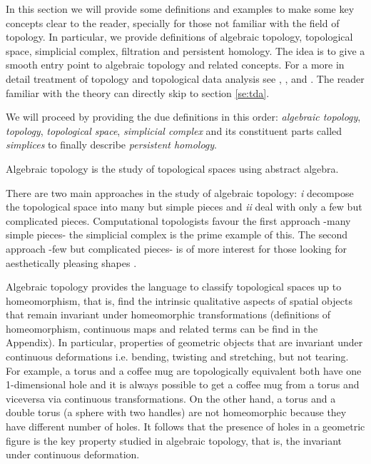 \documentclass[onecollarge,runningheads]{svjour2}
\begin{document}
In this section we will provide some definitions and examples to make some key concepts clear to the reader, specially for those not familiar with the field of topology. In particular, we provide definitions of algebraic topology, topological space, simplicial complex, filtration and persistent homology. The idea is to give a smooth entry point to algebraic topology and related concepts. For a more in detail treatment of topology and topological data analysis see \cite{munkres1984elements}, \cite{hatcher2001}, \cite{carlsson2009topology} and \cite{wasserman2016topological}. The reader familiar with the theory can directly skip to section \ref{se:tda}.

We will proceed by providing the due definitions in this order: \emph{algebraic topology}, \emph{topology}, \emph{topological space}, \emph{simplicial complex} and its constituent parts called \emph{simplices} to finally describe \emph{persistent homology}. 

\begin{definition}
Algebraic topology is the study of topological spaces using abstract algebra.
\end{definition}

There are two main approaches in the study of algebraic topology: \emph{i} decompose the topological space into many but simple pieces and \emph{ii} deal with only a few but complicated pieces. Computational topologists favour the first approach -many simple pieces- the simplicial complex is the prime example of this. The second approach -few but complicated pieces- is of more interest for those looking for aesthetically pleasing shapes \cite{edelsbrunner2010computational}.

Algebraic topology provides the language to classify topological spaces up to homeomorphism, that is, find the intrinsic qualitative aspects of spatial objects that remain invariant under homeomorphic transformations (definitions of homeomorphism, continuous maps and related terms can be find in the Appendix). In particular, properties of geometric objects that are invariant under continuous deformations i.e. bending, twisting and stretching, but not tearing.
For example, a torus and a coffee mug are topologically equivalent both have one 1-dimensional hole and it is always possible to get a coffee mug from a torus and viceversa via continuous transformations. On the other hand, a torus and a double torus (a sphere with two handles) are not homeomorphic because they have different number of holes.
It follows that the presence of holes in a geometric figure is the key property studied in algebraic topology, that is, the invariant under continuous deformation. 
\end{document}
